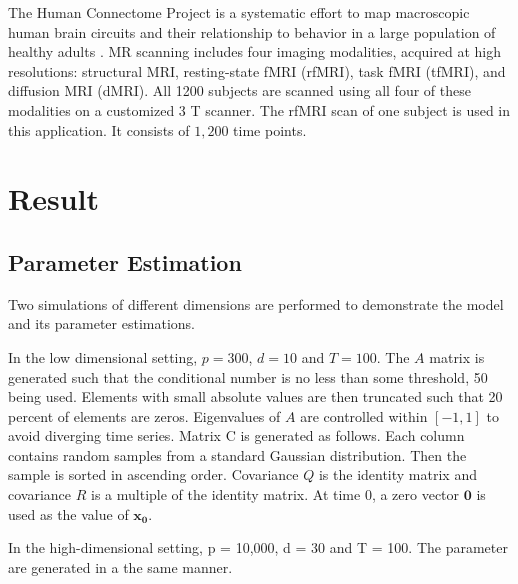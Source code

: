 \documentclass[fleqn]{article}
\begin{document}
The Human Connectome Project is a systematic effort to map macroscopic human brain circuits and their relationship to behavior in a large population of healthy adults \cite{van2013wu,moeller2010multiband,feinberg2010multiplexed}. MR scanning includes four imaging modalities, acquired at high resolutions: structural MRI, resting-state fMRI (rfMRI), task fMRI (tfMRI), and diffusion MRI (dMRI). All 1200 subjects are scanned using all four of these modalities on a customized 3 T scanner. The rfMRI scan of one subject is used in this application. It consists of $1,200$ time points.

\section{Result}
\subsection{Parameter Estimation}
\label{sec:lowdsim}
Two simulations of different dimensions are performed to demonstrate the model and its parameter estimations.

In the low dimensional setting, $p = 300$, $d = 10$ and $T = 100$. The $A$ matrix is generated such that the conditional number is no less than some threshold, 50 being used. Elements with small absolute values are then truncated such that 20 percent of elements are zeros. Eigenvalues of $A$ are controlled within $[-1,1]$ to avoid diverging time series. Matrix C is generated as follows. Each column contains random samples from a standard Gaussian distribution. Then the sample is sorted in ascending order. Covariance $Q$ is the identity matrix and covariance $R$ is a multiple of the identity matrix. At time 0, a zero vector $\mathbf{0}$ is used as the value of $\mathbf{x_0}$.

In the high-dimensional setting, p = 10,000, d = 30 and T = 100. The parameter are generated in a the same manner.
\end{document}
